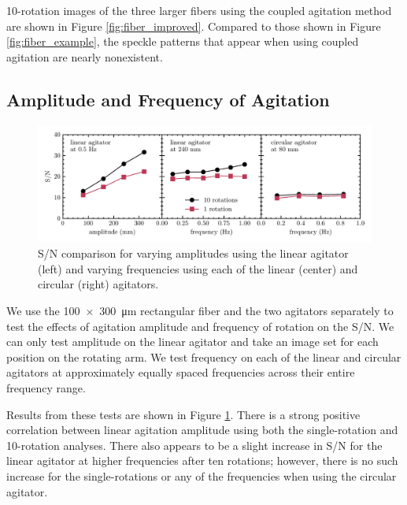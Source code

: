 10-rotation images of the three larger fibers using the coupled agitation method are shown in Figure \ref{fig:fiber_improved}. Compared to those shown in Figure \ref{fig:fiber_example}, the speckle patterns that appear when using coupled agitation are nearly nonexistent.

\subsection{Amplitude and Frequency of Agitation}
\label{subsec:amp_freq}

\begin{figure}[t]
\centering
	\includegraphics[width=\textwidth]{figures-2/amp_freq_snr.pdf}
	\caption[Signal-to-noise comparison across amplitude and mode of agitation]{S/N comparison for varying amplitudes using the linear agitator (left) and varying frequencies using each of the linear (center) and circular (right) agitators.}
\label{fig:amp_freq_snr}
\end{figure}

We use the \SI{100x300}{\micro\meter} rectangular fiber and the two agitators separately to test the effects of agitation amplitude and frequency of rotation on the S/N. We can only test amplitude on the linear agitator and take an image set for each position on the rotating arm. We test frequency on each of the linear and circular agitators at approximately equally spaced frequencies across their entire frequency range.

Results from these tests are shown in Figure \ref{fig:amp_freq_snr}. There is a strong positive correlation between linear agitation amplitude using both the single-rotation and 10-rotation analyses. There also appears to be a slight increase in S/N for the linear agitator at higher frequencies after ten rotations; however, there is no such increase for the single-rotations or any of the frequencies when using the circular agitator.

